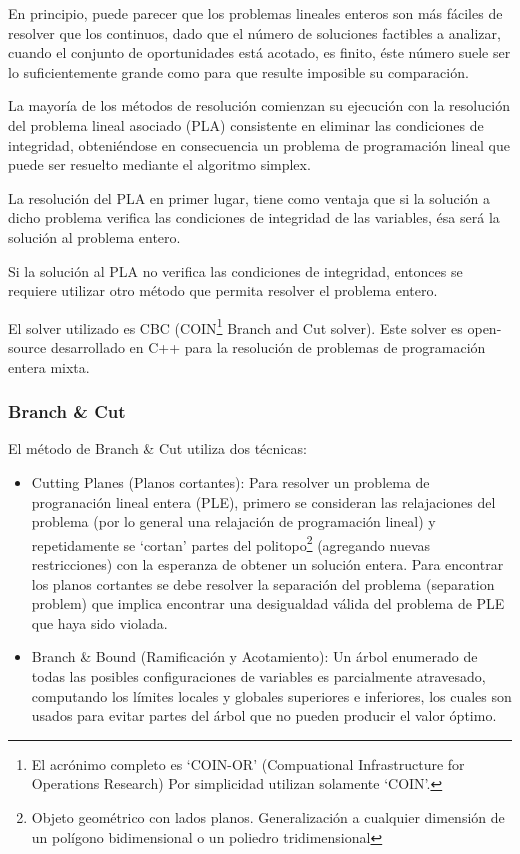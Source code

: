\documentclass[a4paper]{article}
\begin{document}
En principio, puede parecer que los problemas lineales enteros son más fáciles de resolver que los continuos, dado que el número de soluciones factibles a analizar, cuando el conjunto de oportunidades está acotado, es finito, éste número suele ser lo suficientemente grande como para que resulte imposible su comparación.\newline

La mayoría de los métodos de resolución comienzan su ejecución con la resolución del problema lineal asociado (PLA) consistente en eliminar las condiciones de integridad, obteniéndose en consecuencia un problema de programación lineal que puede ser resuelto mediante el algoritmo simplex.

La resolución del PLA en primer lugar, tiene como ventaja que si la solución a dicho problema verifica las condiciones de integridad de las variables, ésa será la solución al problema entero.

Si la solución al PLA no verifica las condiciones de integridad, entonces se requiere utilizar otro método que permita resolver el problema entero.

El solver utilizado es CBC (COIN\footnote{El acrónimo completo es `COIN-OR' (Compuational Infrastructure for Operations Research) Por simplicidad utilizan solamente `COIN'.} Branch and Cut solver). Este solver es open-source desarrollado en C++ para la resolución de problemas de programación entera mixta.

\subsubsection{Branch \& Cut}

El método de Branch \& Cut utiliza dos técnicas:

\begin{itemize}
	\item Cutting Planes (Planos cortantes): Para resolver un problema de progranación lineal entera (PLE), primero se consideran las relajaciones del problema (por lo general una relajación de programación lineal) y repetidamente se `cortan' partes del politopo\footnote{Objeto geométrico con lados planos. Generalización a cualquier dimensión de un polígono bidimensional o un poliedro tridimensional} (agregando nuevas restricciones) con la esperanza de obtener  un solución entera. Para encontrar los planos cortantes se debe resolver la separación del problema (separation problem) que implica encontrar una desigualdad válida del problema de PLE que haya sido violada.
	
	\item Branch \& Bound (Ramificación y Acotamiento): Un árbol enumerado de todas las posibles configuraciones de variables es parcialmente atravesado, computando los límites locales y globales superiores e inferiores, los cuales son usados para evitar partes del árbol que no pueden producir el valor óptimo.

\end{itemize}
\end{document}
